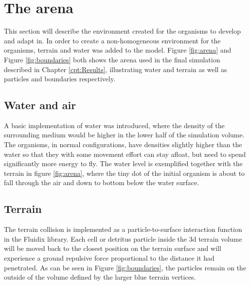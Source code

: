 \section{The arena}
This section will describe the environment created for the organisms to develop and adapt in. In order to create a non-homogeneous environment for the organisms, terrain and water was added to the model. Figure \ref{fig:arena} and Figure \ref{fig:boundaries} both shows the arena used in the final simulation described in Chapter \ref{cpt:Results}, illustrating water and terrain as well as particles and boundaries respectively.

\subsection{Water and air}
A basic implementation of water was introduced, where the density of the surrounding medium would be higher in the lower half of the simulation volume. The organisms, in normal configurations, have densities slightly higher than the water so that they with some movement effort can stay afloat, but need to spend significantly more energy to fly. The water level is exemplified together with the terrain in figure \ref{fig:arena}, where the tiny dot of the initial organism is about to fall through the air and down to bottom below the water surface.

\subsection{Terrain}\label{subsec:terrain}
The terrain collision is implemented as a particle-to-surface interaction function in the Fluidix library. Each cell or detritus particle inside the 3d terrain volume will be moved back to the closest position on the terrain surface and will experience a ground repulsive force proportional to the distance it had penetrated. As can be seen in Figure \ref{fig:boundaries}, the particles remain on the outside of the volume defined by the larger blue terrain vertices.

